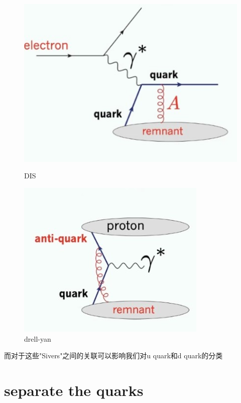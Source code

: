 \documentclass[12pt, a4paper, oneside]{ctexart}
\begin{document}
\begin{spacing}{2.0}
\begin{figure}
    \begin{minipage}[t]{0.5\linewidth}
        \centering
        \includegraphics[scale=0.2]{DIS.jpg}
        \caption{DIS}
        \label{fig:side:a}
      \end{minipage}%
      \begin{minipage}[t]{0.5\linewidth}
        \centering
        \includegraphics[scale=0.3]{drell.jpg}
        \caption{drell-yan}
        \label{fig:side:b}
      \end{minipage}
\end{figure}

而对于这些"Sivers"之间的关联可以影响我们对u quark和d quark的分类

\section{separate the quarks}


\end{spacing}
\end{document}
